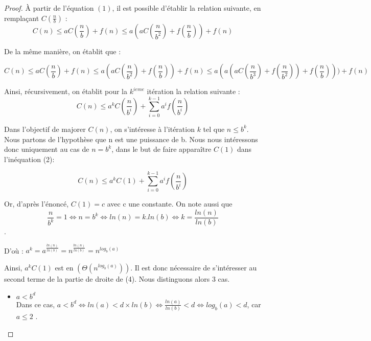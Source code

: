 \documentclass[a4paper,10pt]{article}
\begin{document}
\begin{proof}
  \`A partir de l'équation $(1)$, il est possible d'établir la relation suivante, en remplaçant $C(\frac{n}{b})$ :
  $$C(n)
  \leq aC(\frac{n}{b})+f(n)
  \leq a(aC(\frac{n}{b^2})+f(\frac{n}{b}))+f(n)$$

De la même manière, on établit que :

  $$C(n)
  \leq aC(\frac{n}{b})+f(n)
  \leq a(aC(\frac{n}{b^2})+f(\frac{n}{b}))+f(n)
  \leq a(a(aC(\frac{n}{b^3})+f(\frac{n}{b^2}))+f(\frac{n}{b})))+f(n)$$

  Ainsi, récursivement, on établit pour la $k^{ieme}$ itération la relation suivante :
\begin{equation}
  C(n) \leq a^kC(\frac{n}{b^i})+\sum_{i=0}^{k-1}a^if(\frac{n}{b^i})
\end{equation}

Dans l'objectif de majorer $C(n)$, on s'intéresse à l'itération $k$ tel que $n \leq b^{k}$. Nous partons de l'hypothèse que n est une puissance de b. Nous nous intéressons donc uniquement au cas de $n = b^{k}$, dans le but de faire apparaître $C(1)$ dans l'inéquation (2):

\begin{equation}
  C(n) \leq a^kC(1)+\sum_{i=0}^{k-1}a^if(\frac{n}{b^i})
\end{equation}

Or, d'après l'énoncé, $C(1) = c$ avec c une constante. On note aussi que   $$\frac{n}{b^k}=1 \Leftrightarrow n=b^k \Leftrightarrow ln(n)=k.ln(b) \Leftrightarrow k=\frac{ln(n)}{ln(b)}$$ . 

D'où : $a^{k} = a^{\frac{ln(n)}{ln(b)}} = n^{\frac{ln(n)}{ln(b)}} = n^{log_{b}(a)}$

Ainsi, $a^kC(1)$ est en $(\Theta (n^{log_{b}(a)}))$. Il est donc nécessaire de s'intéresser au second terme de la partie de droite de (4). Nous distinguons alors 3 cas.\\

\begin{itemize}
  \item $a<b^d$ \\
	Dans ce cas, $a<b^d \Leftrightarrow ln(a) < d \times ln(b) \Leftrightarrow \frac{ln(a)}{ln(b)} < d \Leftrightarrow log_{b}(a) < d$, car $a \leq 2$ .



\end{itemize}
\end{proof}
\end{document}
